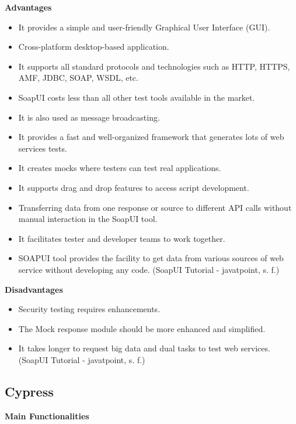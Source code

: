 \documentclass{article}
\begin{document}
	\textbf{Advantages}
	
	\begin{itemize}
		\item It provides a simple and user-friendly Graphical User Interface (GUI).
		\item Cross-platform desktop-based application.
		\item It supports all standard protocols and technologies such as HTTP, HTTPS, AMF, JDBC, SOAP, WSDL, etc.
		\item SoapUI costs less than all other test tools available in the market.
		\item It is also used as message broadcasting.
		\item It provides a fast and well-organized framework that generates lots of web services tests.
		\item It creates mocks where testers can test real applications.
		\item It supports drag and drop features to access script development.
		\item Transferring data from one response or source to different API calls without manual interaction in the SoapUI tool.
		\item It facilitates tester and developer teams to work together.
		\item SOAPUI tool provides the facility to get data from various sources of web service without developing any code. (SoapUI Tutorial - javatpoint, s. f.)
	\end{itemize}
	
	
	\textbf{Disadvantages}
	
	\begin{itemize}
		\item Security testing requires enhancements.
		\item The Mock response module should be more enhanced and simplified.
		\item It takes longer to request big data and dual tasks to test web services. (SoapUI Tutorial - javatpoint, s. f.)
	\end{itemize}
	
	
	
	
	\subsection{Cypress}
	
	\textbf{Main Functionalities}
	
\end{document}
